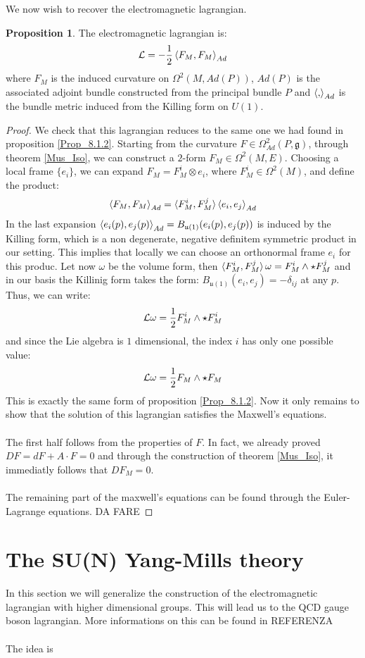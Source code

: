 \documentclass[12pt,a4paper]{report}
\theoremstyle{definition}
\theoremstyle{Theorem}
\newtheorem{Prop}[Def]{Proposition}
\theoremstyle{definition}
\theoremstyle{definition}
\begin{document}
	We now wish to recover the electromagnetic lagrangian.
	\begin{Prop}
		The electromagnetic lagrangian is:
		$$\mathcal{L}=-{1\over 2}\braket{F_M,F_M}_{Ad}$$
		where $F_M$ is the induced curvature on $\Omega^2(M,Ad(P))$, $Ad(P)$ is the associated adjoint bundle constructed from the principal bundle $P$ and $\braket{,}_{Ad}$ is the bundle metric induced from the Killing form on $U(1)$.
	\end{Prop}
	\begin{proof}
		We check that this lagrangian reduces to the same one we had found in proposition \ref{Prop_8.1.2}. Starting from the curvature $F\in \Omega^2_{Ad}(P,\mathfrak{g})$, through theorem \ref{Mus_Iso}, we can construct a $2$-form $F_M\in \Omega^2(M,E)$. Choosing a local frame $\{e_i\}$, we can expand $F_M=F^i_{M}\otimes e_i$, where $F_M^i\in \Omega^2(M)$, and define the product: $$\braket{F_M,F_M}_{Ad}=\braket{F_M^i,F_M^j}\braket{e_i,e_j}_{Ad}$$
		In the last expansion $\braket{e_i(p),e_j(p)}_{Ad}=B_{\mathfrak{u}(1)}(e_i(p),e_j(p))$ is induced by the Killing form, which is a non degenerate, negative definitem symmetric product in our setting. This implies that locally we can choose an orthonormal frame $e_i$ for this produc. Let now $\omega$ be the volume form, then $\braket{F_M^i,F_M^j}\omega=F_M^i\wedge\star F_M^j$ and in our basis the Killinig form takes the form: $B_{\mathfrak{u}(1)}(e_i,e_j)=-\delta_{ij}$ at any $p$. Thus, we can write:
		$$\mathcal{L}\omega={1\over 2}F_M^i\wedge \star F_M^i$$
		and since the Lie algebra is $1$ dimensional, the index $i$ has only one possible value:
		$$\mathcal{L}\omega={1\over 2}F_M\wedge \star F_M$$
		This is exactly the same form of proposition \ref{Prop_8.1.2}. Now it only remains to show that the solution of this lagrangian satisfies the Maxwell's equations. \\\\
		The first half follows from the properties of $F$. In fact, we already proved $DF=dF+A\cdot F=0$ and through the construction of theorem \ref{Mus_Iso}, it immediatly follows that $DF_M=0$.\\
		\\
		The remaining part of the maxwell's equations can be found through the Euler-Lagrange equations. DA FARE
	\end{proof}
	\section{The SU(N) Yang-Mills theory}
	In this section we will generalize the construction of the electromagnetic lagrangian with higher dimensional groups. This will lead us to the QCD gauge boson lagrangian. More informations on this can be found in REFERENZA\\
	\\
	The idea is
\end{document}
